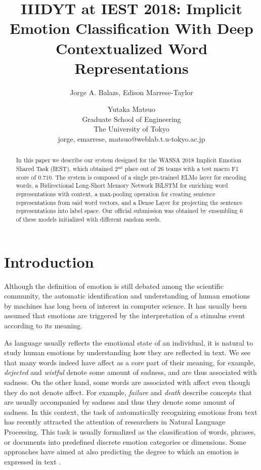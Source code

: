 \documentclass[11pt,a4paper]{article}
\title{IIIDYT at IEST 2018: Implicit Emotion Classification With Deep
Contextualized Word Representations}
\author{Jorge A. Balazs, Edison Marrese-Taylor \and Yutaka Matsuo \\
  Graduate School of Engineering\\
  The University of Tokyo\\
  {jorge, emarrese, matsuo@weblab.t.u-tokyo.ac.jp} \\
}
\date{}
\begin{document}
\maketitle
\begin{abstract}
In this paper we describe our system designed for the WASSA 2018 Implicit Emotion Shared Task (IEST), which obtained 2$^{\text{nd}}$ place out of 26 teams with a test macro F1 score of $0.710$. The system is composed of a single pre-trained ELMo layer for encoding words, a Bidirectional Long-Short Memory Network BiLSTM for enriching word representations with context, a max-pooling operation for creating sentence representations from said word vectors, and a Dense Layer for projecting the sentence representations into label space. Our official submission was obtained by ensembling 6 of these models initialized with different random seeds.
\end{abstract}

\section{Introduction}

Although the definition of emotion is still debated among the scientific community, the automatic identification and understanding of human emotions by machines has long been of interest in computer science. It has usually been assumed that emotions are triggered by the interpretation of a stimulus event according to its meaning. 

As language usually reflects the emotional state of an individual, it is natural to study human emotions by understanding how they are reflected in text. We see that many words indeed have affect as a core part of their meaning, for example, \textit{dejected} and \textit{wistful} denote some amount of sadness, and are thus associated with sadness. On the other hand, some words are associated with affect even though they do not denote affect. For example, \textit{failure} and \textit{death} describe concepts that are usually accompanied by sadness and thus they denote some amount of sadness. In this context, the task of automatically recognizing emotions from text has recently attracted the attention of researchers in Natural Language Processing. This task is usually formalized as the classification of words, phrases, or documents into predefined discrete emotion categories or dimensions. Some approaches have aimed at also predicting the degree to which an emotion is expressed in text \cite{wassa_emoint_2017}.
\end{document}
